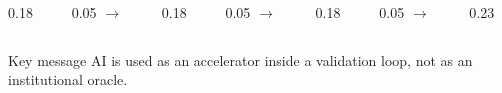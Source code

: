 \begin{frame}[t]

  \vspace{0.3cm}

  \begin{columns}[c,onlytextwidth]
    \begin{column}{0.18\textwidth}
    \end{column}
    \begin{column}{0.05\textwidth}
      \centering $\rightarrow$
    \end{column}
    \begin{column}{0.18\textwidth}
    \end{column}
    \begin{column}{0.05\textwidth}
      \centering $\rightarrow$
    \end{column}
    \begin{column}{0.18\textwidth}
    \end{column}
    \begin{column}{0.05\textwidth}
      \centering $\rightarrow$
    \end{column}
    \begin{column}{0.23\textwidth}
    \end{column}
  \end{columns}

  \vspace{0.8cm}

  \begin{block}{Key message}
    AI is used as an accelerator inside a validation loop, not as an institutional oracle.
  \end{block}
\end{frame}

